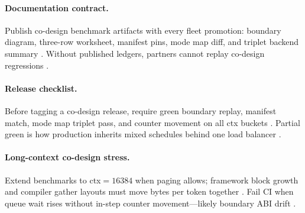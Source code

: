\paragraph{Documentation contract.} Publish co-design benchmark artifacts with every fleet promotion: boundary diagram, three-row worksheet, manifest pins, mode map diff, and triplet backend summary \citep{yirage2026,chen2020compilerbasedhardw,patel2025llminference,kwon2023vllm,taxbreak2026,memoryfloor2026,liu2024deepseekv3,nvidia2024cudagraphs,dao2022flashattention,amd2024xdna,amd2024aie,dlbook,dao2023flashdecoding,nvidia2022hopper,semianalysis2024tma}. Without published ledgers, partners cannot replay co-design regressions \citep{patel2025llminference,yirage2026,chen2020compilerbasedhardw,kwon2023vllm,dlbook}.

\paragraph{Release checklist.} Before tagging a co-design release, require green boundary replay, manifest match, mode map triplet pass, and counter movement on all ctx buckets \citep{yirage2026,chen2020compilerbasedhardw,patel2025llminference,kwon2023vllm,taxbreak2026,memoryfloor2026,liu2024deepseekv3,nvidia2024cudagraphs,dao2022flashattention,amd2024aie,amd2024xdna,dlbook,dao2023flashdecoding,nvidia2022hopper,semianalysis2024tma}. Partial green is how production inherits mixed schedules behind one load balancer \citep{patel2025llminference,yirage2026,chen2020compilerbasedhardw,kwon2023vllm,memoryfloor2026,taxbreak2026,dlbook}.

\paragraph{Long-context co-design stress.} Extend benchmarks to ctx${=}16384$ when paging allows; framework block growth and compiler gather layouts must move bytes per token together \citep{kwon2023vllm,dao2022flashattention,yirage2026,chen2020compilerbasedhardw,patel2025llminference,memoryfloor2026,taxbreak2026,liu2024deepseekv3,nvidia2024cudagraphs,amd2024aie,amd2024xdna,dlbook,dao2023flashdecoding,nvidia2022hopper,semianalysis2024tma}. Fail CI when queue wait rises without in-step counter movement---likely boundary ABI drift \citep{kwon2023vllm,yirage2026,chen2020compilerbasedhardw,patel2025llminference,memoryfloor2026,taxbreak2026,dlbook}.

